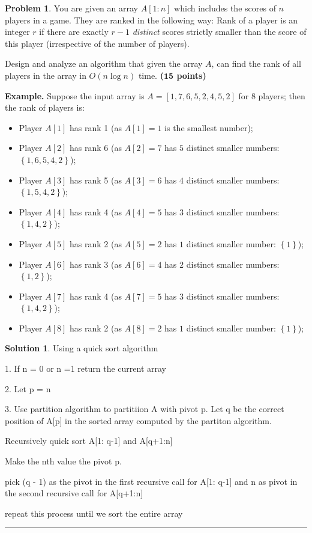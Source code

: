 \documentclass{article}
\theoremstyle{definition}
\newtheorem{problem}{Problem}
\def\fline{\rule{0.75\linewidth}{0.5pt}}
\newcommand{\finishline}{\begin{center}\fline\end{center}}
\newtheorem*{solution*}{Solution}
\newenvironment{solution}{\begin{solution*}}{{\finishline} \end{solution*}}
\newcommand{\grade}[1]{\hfill{\textbf{($\mathbf{#1}$ points)}}}
\newcommand{\set}[1]{\ensuremath{\left\{ #1 \right\}}}
\begin{document}
\smallskip

\begin{problem}
    You are given an array $A[1:n]$ which includes the scores of $n$ players in a game. They are ranked in the following way: 
    Rank of a player is an integer $r$ if there are exactly $r-1$ \emph{distinct} scores strictly smaller than the score of this player (irrespective of the number of players).
  
  \begin{enumerate}
  	\item[(a)] Design and analyze an algorithm that given the array $A$, can find the rank of all players in the array in $O(n\log{n})$ time. \grade{15}
    
    	\medskip
    
    \textbf{Example.} Suppose the input array is $A=[1,7,6,5,2,4,5,2]$ for 8 players; then the rank of  players is: 
    \begin{itemize}
        \item Player $A[1]$ has rank 1 (as $A[1]=1$ is the smallest number); 
        \item Player $A[2]$ has rank 6 (as $A[2]=7$ has $5$ distinct smaller numbers: $\set{1,6,5,4,2}$);
        \item Player $A[3]$ has rank 5 (as $A[3]=6$ has $4$ distinct smaller numbers: $\set{1,5,4,2}$);
        \item Player $A[4]$ has rank 4 (as $A[4]=5$ has $3$ distinct smaller numbers: $\set{1,4,2}$);
        \item Player $A[5]$ has rank 2 (as $A[5]=2$ has $1$ distinct smaller number: $\set{1}$);
        \item Player $A[6]$ has rank 3 (as $A[6]=4$ has $2$ distinct smaller numbers: $\set{1,2}$);
        \item Player $A[7]$ has rank 4 (as $A[7]=5$ has $3$ distinct smaller numbers: $\set{1,4,2}$);
        \item Player $A[8]$ has rank 2 (as $A[8]=2$ has $1$ distinct smaller number: $\set{1}$);
    \end{itemize}
    
    
    		    \begin{solution}
	\item Using a quick sort algorithm
	\item 1. If n = 0 or n =1 return the current array
	\item 2. Let p = n 
	\item 3. Use partition algorithm to partitiion A with pivot p. Let q be the correct position of A[p] in the sorted array computed by the partiton algorithm.
	\item Recursively quick sort A[1: q-1] and A[q+1:n]
	\item Make the nth value the pivot p.
	\item pick (q - 1) as the pivot in the first recursive call for A[1: q-1] and n as pivot in the second recursive call for A[q+1:n]
	\item repeat this process until we sort the entire array


\end{solution}
\end{enumerate}
\end{problem}
\end{document}
